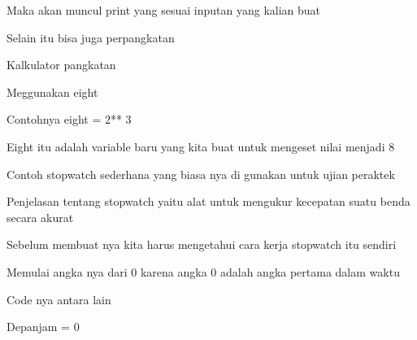 \vspace{14pt}
\noindent 
{\fontsize{14pt}{14pt}\selectfont Maka akan muncul print yang sesuai inputan yang kalian buat \\} \par
\vspace{14pt}
\noindent 
{\fontsize{14pt}{14pt}\selectfont Selain itu bisa juga perpangkatan  \\} \par
\noindent 
{\fontsize{14pt}{14pt}\selectfont Kalkulator pangkatan \\} \par
\noindent 
{\fontsize{14pt}{14pt}\selectfont Meggunakan eight \\} \par
\vspace{14pt}
\noindent 
{\fontsize{14pt}{14pt}\selectfont Contohnya eight = 2** 3 \\} \par
\vspace{14pt}
\noindent 
{\fontsize{14pt}{14pt}\selectfont Eight itu adalah variable baru yang kita buat untuk mengeset nilai menjadi 8 \\} \par
\vspace{14pt}
\noindent 
{\fontsize{14pt}{14pt}\selectfont Contoh stopwatch sederhana yang biasa nya di gunakan untuk ujian peraktek  \\} \par
\vspace{14pt}
\noindent 
{\fontsize{14pt}{14pt}\selectfont Penjelasan tentang stopwatch yaitu alat untuk mengukur kecepatan suatu benda secara akurat \\} \par
\vspace{14pt}
\noindent 
{\fontsize{14pt}{14pt}\selectfont Sebelum membuat nya kita harus mengetahui cara kerja stopwatch itu sendiri  \\} \par
\vspace{14pt}
\noindent 
{\fontsize{14pt}{14pt}\selectfont Memulai angka nya dari 0 karena angka 0 adalah angka pertama dalam waktu \\} \par
\noindent 
{\fontsize{14pt}{14pt}\selectfont Code nya antara lain \\} \par
\vspace{14pt}
\noindent 
{\fontsize{14pt}{14pt}\selectfont Depanjam = 0 \\} \par
